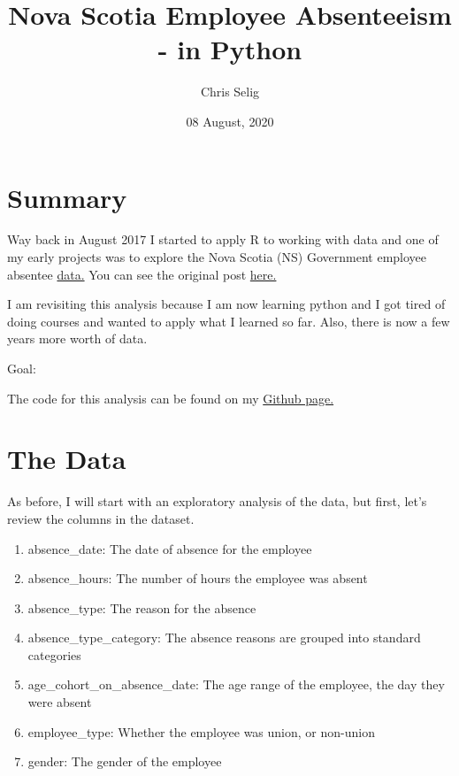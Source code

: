 \documentclass[
]{article}
\title{Nova Scotia Employee Absenteeism - in Python}
\author{Chris Selig}
\date{08 August, 2020}
\begin{document}
\maketitle

\hypertarget{summary}{%
\section{Summary}\label{summary}}

Way back in August 2017 I started to apply R to working with data and
one of my early projects was to explore the Nova Scotia (NS) Government
employee absentee
\href{https://data.novascotia.ca/Public-Service/Nova-Scotia-Government-Employee-Absenteeism/3kpf-veux}{data.}
You can see the original post
\href{https://bidamia.ca/post/nova-scotia-government-employee-absentee-analysis/}{here.}

I am revisiting this analysis because I am now learning python and I got
tired of doing courses and wanted to apply what I learned so far. Also,
there is now a few years more worth of data.

Goal:

The code for this analysis can be found on my
\href{https://github.com/chrisselig/ns_employee_absenteeism_python}{Github
page.}

\hypertarget{the-data}{%
\section{The Data}\label{the-data}}

As before, I will start with an exploratory analysis of the data, but
first, let's review the columns in the dataset.

\begin{enumerate}
\def\labelenumi{\arabic{enumi}.}
\item
  absence\_date: The date of absence for the employee
\item
  absence\_hours: The number of hours the employee was absent
\item
  absence\_type: The reason for the absence
\item
  absence\_type\_category: The absence reasons are grouped into standard
  categories
\item
  age\_cohort\_on\_absence\_date: The age range of the employee, the day
  they were absent
\item
  employee\_type: Whether the employee was union, or non-union
\item
  gender: The gender of the employee
\end{enumerate}
\end{document}
